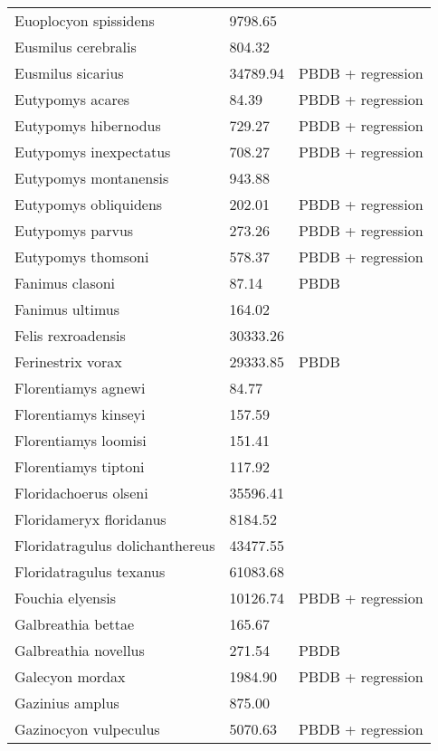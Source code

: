 \documentclass{article}
\begin{document}
\begin{center}
\begin{longtable}{p{} p{} p{}}
    Euoplocyon spissidens & 9798.65 & \cite{Tomiya2013} \\ 
    Eusmilus cerebralis & 804.32 & \cite{Tomiya2013} \\ 
    Eusmilus sicarius & 34789.94 & PBDB + regression \\ 
    Eutypomys acares & 84.39 & PBDB + regression \\ 
    Eutypomys hibernodus & 729.27 & PBDB + regression \\ 
    Eutypomys inexpectatus & 708.27 & PBDB + regression \\ 
    Eutypomys montanensis & 943.88 & \cite{Tomiya2013} \\ 
    Eutypomys obliquidens & 202.01 & PBDB + regression \\ 
    Eutypomys parvus & 273.26 & PBDB + regression \\ 
    Eutypomys thomsoni & 578.37 & PBDB + regression \\ 
    Fanimus clasoni & 87.14 & PBDB \\ 
    Fanimus ultimus & 164.02 & \cite{Tomiya2013} \\ 
    Felis rexroadensis & 30333.26 & \cite{Tomiya2013} \\ 
    Ferinestrix vorax & 29333.85 & PBDB \\ 
    Florentiamys agnewi & 84.77 & \cite{Tomiya2013} \\ 
    Florentiamys kinseyi & 157.59 & \cite{Tomiya2013} \\ 
    Florentiamys loomisi & 151.41 & \cite{Tomiya2013} \\ 
    Florentiamys tiptoni & 117.92 & \cite{Tomiya2013} \\ 
    Floridachoerus olseni & 35596.41 & \cite{Tomiya2013} \\ 
    Floridameryx floridanus & 8184.52 & \cite{Tomiya2013} \\ 
    Floridatragulus dolichanthereus & 43477.55 & \cite{Tomiya2013} \\ 
    Floridatragulus texanus & 61083.68 & \cite{Tomiya2013} \\ 
    Fouchia elyensis & 10126.74 & PBDB + regression \\ 
    Galbreathia bettae & 165.67 & \cite{Tomiya2013} \\ 
    Galbreathia novellus & 271.54 & PBDB \\ 
    Galecyon mordax & 1984.90 & PBDB + regression \\ 
    Gazinius amplus & 875.00 & \cite{Soligo2006} \\ 
    Gazinocyon vulpeculus & 5070.63 & PBDB + regression \\ 

\end{longtable}
\end{center}
\end{document}
